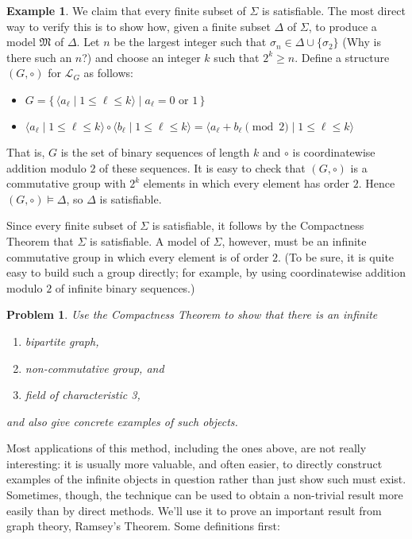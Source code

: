 \documentclass[12pt]{amsbook}
\theoremstyle{plain}
\newtheorem{prob}[thm]{Problem}
\theoremstyle{definition}
\newtheorem{exmp}{Example}[chapter]
\theoremstyle{remark}
\begin{document}
\begin{exmp}
We claim that every finite subset of $\Sigma$ is satisfiable.  The most direct way to verify this is to show how,  given a finite subset $\Delta$ of $\Sigma$,  to produce a model $\mathfrak{M}$ of $\Delta$.  Let $n$ be the largest integer such that $\sigma_n \in \Delta \cup \{ \sigma_2 \}$ (Why is there such an $n$?) and choose an integer $k$ such that $2^k \ge n$.  Define a structure $(G,\circ)$ for $\mathcal{L}_G$ as follows:
\begin{itemize}
\item $G = \{\, \langle a_\ell \mid 1 \le \ell \le k \rangle \mid a_\ell = 0 \text{\ or\ } 1 \,\}$
\item $\langle a_\ell \mid 1 \le \ell \le k \rangle \circ \langle b_\ell \mid 1 \le \ell \le k \rangle = \langle a_\ell + b_\ell \pmod 2 \mid 1 \le \ell \le k \rangle$
\end{itemize}
That is,  $G$ is the set of binary sequences of length $k$ and $\circ$ is coordinatewise addition modulo $2$ of these sequences.  It is easy to check that $(G,\circ)$ is a commutative group with $2^k$ elements in which every element has order $2$.  Hence $(G,\circ) \models \Delta$,  so $\Delta$ is satisfiable.

Since every finite subset of $\Sigma$ is satisfiable,  it follows by the Compactness Theorem that $\Sigma$ is satisfiable.  A model of $\Sigma$,  however,  must be an infinite commutative group in which every element is of order $2$.  (To be sure,  it is quite easy to build such a group directly;  for example,  by using coordinatewise addition modulo $2$ of infinite binary sequences.)
\end{exmp}

\begin{prob} \label{p:nine1}
Use the Compactness Theorem to show that there is an infinite
\begin{enumerate}
\item bipartite graph,
\item non-commutative group,  and
\item field of characteristic 3,
\end{enumerate}
and also give concrete examples of such objects.
\end{prob}

Most applications of this method,  including the ones above,  are not really interesting:  it is usually more valuable,  and often easier,  to directly construct examples of the infinite objects in question rather than just show such must exist.  Sometimes,  though,  the technique can be used to obtain a non-trivial result more easily than by direct methods.  We'll use it to prove an important result from graph theory,  Ramsey's Theorem.  Some definitions first:  
\end{document}
